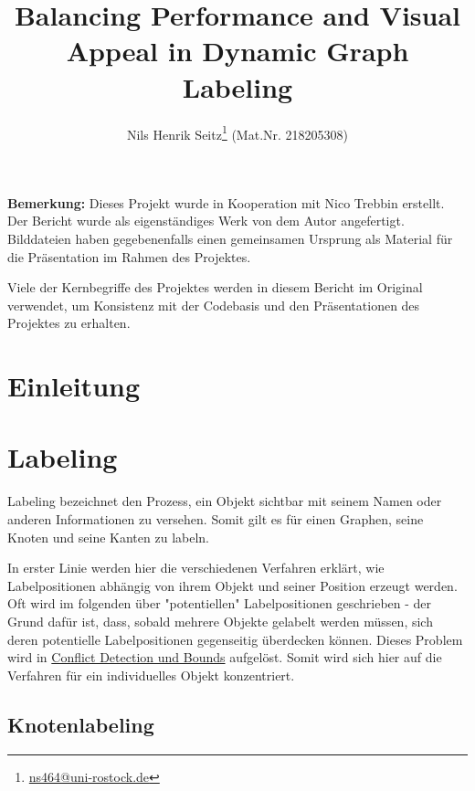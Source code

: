 \documentclass[final,nopreprintline]{elsarticle}
\begin{document}
\begin{frontmatter}

\title{Balancing Performance and Visual Appeal in Dynamic Graph Labeling}
\author{Nils Henrik Seitz\footnote[1]{\href{mailto:ns464@uni-rostock.de}{ns464@uni-rostock.de}} (Mat.Nr. 218205308)}
\address{Faculty of Computer Science \\University of Rostock}


\begin{abstract}
    
\end{abstract}


\end{frontmatter}


\textbf{Bemerkung:} Dieses Projekt wurde in Kooperation mit Nico Trebbin erstellt. Der Bericht wurde als eigenständiges Werk von dem Autor angefertigt.
Bilddateien haben gegebenenfalls einen gemeinsamen Ursprung als Material für die Präsentation im Rahmen des Projektes.

Viele der Kernbegriffe des Projektes werden in diesem Bericht im Original verwendet, um Konsistenz mit der Codebasis und den Präsentationen des Projektes zu erhalten.

\section{Einleitung}
\label{sec:intro}
    


\section{Labeling}
\label{sec:labeling}
Labeling bezeichnet den Prozess, ein Objekt sichtbar mit seinem Namen oder anderen Informationen zu versehen.
Somit gilt es für einen Graphen, seine Knoten und seine Kanten zu labeln.

In erster Linie werden hier die verschiedenen Verfahren erklärt, wie Labelpositionen abhängig von ihrem Objekt und seiner Position erzeugt werden.
Oft wird im folgenden über "potentiellen" Labelpositionen geschrieben - der Grund dafür ist, dass, sobald mehrere Objekte gelabelt werden müssen, sich
deren potentielle Labelpositionen gegenseitig überdecken können. Dieses Problem wird in \hyperref[sec:conflict]{Conflict Detection und Bounds} aufgelöst.
Somit wird sich hier auf die Verfahren für ein individuelles Objekt konzentriert.
\subsection{Knotenlabeling}
\label{subsec:labeling_vertices}
    
\end{document}

